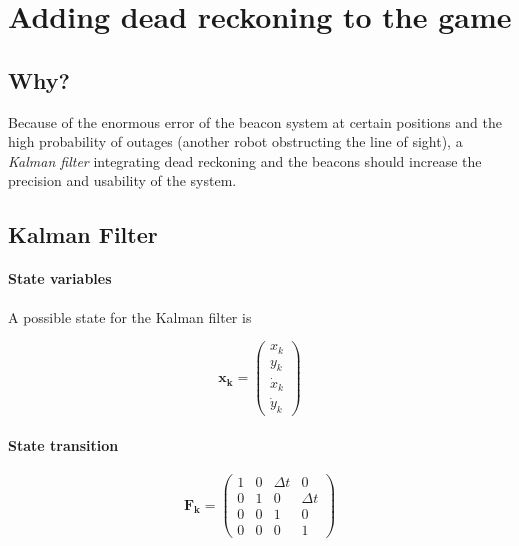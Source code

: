 \documentclass[a4paper, 12pt]{paper}
\begin{document}
\section{Adding dead reckoning to the game}

\subsection{Why?}

Because of the enormous error of the beacon system at certain positions and the
high probability of outages (another robot obstructing the line of sight), a
\emph{Kalman filter} integrating dead reckoning and the beacons should increase
the precision and usability of the system.

\subsection{Kalman Filter}
\paragraph{State variables}

A possible state for the Kalman filter is

\begin{equation}
    \mathbf{x_k} = \left( \begin{array}{c} x_k     \\
                                           y_k     \\
                                           \dot{x}_k \\
                                           \dot{y}_k \end{array} \right)
\label{eq:kalman_state}
\end{equation}

\paragraph{State transition}

\begin{equation}
    \mathbf{F_k} = \left( \begin{array}{cccc} 1 & 0 & \Delta t & 0\\
                                              0 & 1 & 0 & \Delta t \\
                                              0 & 0 & 1 & 0 \\
                                              0 & 0 & 0 & 1 \end{array} \right)
\label{eq:state_trans}
\end{equation}
\end{document}

